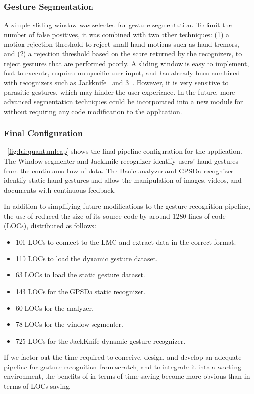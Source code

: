 \subsubsection{Gesture Segmentation}
A simple sliding window was selected for gesture segmentation. To limit the number of false positives, it was combined with two other techniques: (1) a motion rejection threshold to reject small hand motions such as hand tremors, and (2) a rejection threshold based on the score returned by the recognizers, to reject gestures that are performed poorly. A sliding window is easy to implement, fast to execute, requires no specific user input, and has already been combined with recognizers such as Jackknife~\cite{Taranta:2017} and 3\textcent~\cite{Caputo:2019}. However, it is very sensitive to parasitic gestures, which may hinder the user experience. In the future, more advanced segmentation techniques \cite{Kratz:2015,Chen:2016,Taranta:2021} could be incorporated into a new module for \ql without requiring any code modification to the \lui application.

\subsubsection{Final Configuration}
\fig~\ref{fig:lui:quantumleap} shows the final \ql pipeline configuration for the \lui application. The Window segmenter and Jackknife recognizer identify users' hand gestures from the continuous flow of data. The Basic analyzer and GPSDa recognizer identify static hand gestures and allow the manipulation of images, videos, and documents with continuous feedback.

In addition to simplifying future modifications to the \lui gesture recognition pipeline, the use of \ql reduced the size of its source code by around 1280 lines of code (LOCs), distributed as follows: 
\begin{itemize}[noitemsep]
    \item 101 LOCs to connect to the LMC and extract data in the correct format.
    \item 110 LOCs to load the dynamic gesture dataset.
    \item 63 LOCs to load the static gesture dataset.
    \item 143 LOCs for the GPSDa static recognizer.
    \item 60 LOCs for the analyzer.
    \item 78 LOCs for the window segmenter.
    \item 725 LOCs for the JackKnife dynamic gesture recognizer.
\end{itemize}
If we factor out the time required to conceive, design, and develop an adequate pipeline for gesture recognition from scratch, and to integrate it into a working environment, the benefits of \ql in terms of time-saving become more obvious than in terms of LOCs saving.

